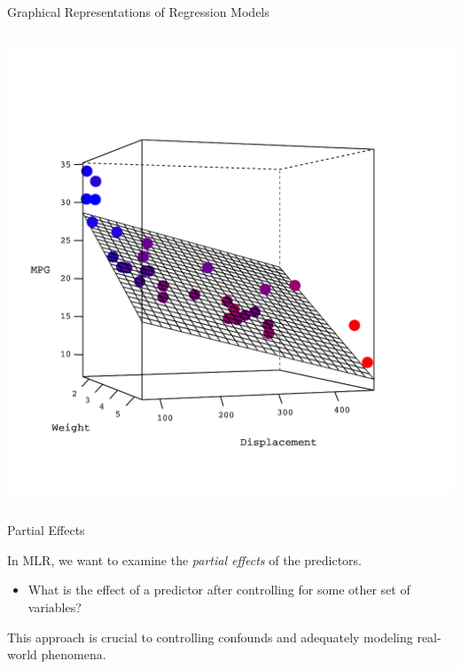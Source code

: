 \documentclass[10pt]{beamer}\usepackage[]{graphicx}\usepackage[]{color}
\begin{document}
\begin{frame}{Graphical Representations of Regression Models}
\begin{columns}
\begin{column}{0.45\textwidth}
      \includegraphics[width = 1.2\textwidth]{figures/response_surface_plot}

    \end{column}
  \end{columns}

\end{frame}

\watermarkon %

\begin{frame}{Partial Effects}

  In MLR, we want to examine the \emph{partial effects} of the predictors.
  \vb
  \begin{itemize}
  \item What is the effect of a predictor after controlling for some other set
    of variables?
  \end{itemize}
  \va
  This approach is crucial to controlling confounds and adequately modeling
  real-world phenomena.

\end{frame}

\end{document}
